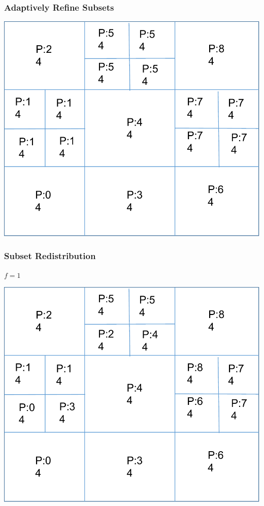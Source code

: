 \documentclass[compress]{beamer}
\begin{document}
\begin{frame}[t]\frametitle{Adaptively Refine Subsets}
\centering
\includegraphics[scale=0.5]{figures/amr.pdf}
\end{frame}

\begin{frame}[t]\frametitle{Subset Redistribution}
\begin{minipage}{0.15\textwidth}
\begin{footnotesize}
$f = 1$
\end{footnotesize}
\end{minipage}
\begin{minipage}{0.8\textwidth}
\centering
\includegraphics[scale=0.5]{figures/domain_overloading.pdf}
\end{minipage}
\end{frame}
\end{document}
